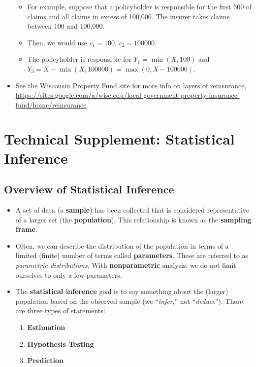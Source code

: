 \documentclass[]{book}
\theoremstyle{definition}
\theoremstyle{definition}
\theoremstyle{definition}
\theoremstyle{remark}
\begin{document}
\begin{itemize}
  \begin{itemize}
  \item
    For example, suppose that a policyholder is responsible for the
    first 500 of claims and all claims in excess of 100,000. The insurer
    takes claims between 100 and 100,000.
  \item
    Then, we would use \(c_1 = 100\), \(c_2 =100000\).
  \item
    The policyholder is responsible for \(Y_1 =\min(X,100)\) and
    \(Y_3 = X - \min(X,100000) = \max(0, X-100000)\).
  \end{itemize}
\item
  See the Wisconsin Property Fund site for more info on layers of
  reinsurance,
  \url{https://sites.google.com/a/wisc.edu/local-government-property-insurance-fund/home/reinsurance}
\end{itemize}

\chapter{Technical Supplement: Statistical
Inference}\label{technical-supplement-statistical-inference}

\section{Overview of Statistical
Inference}\label{overview-of-statistical-inference}

\begin{itemize}
\item
  A set of data (a \textbf{sample}) has been collected that is
  considered representative of a larger set (the \textbf{population}).
  This relationship is known as the \textbf{sampling frame}.
\item
  Often, we can describe the distribution of the population in terms of
  a limited (finite) number of terms called \textbf{parameters}. These
  are referred to as \emph{parametric distributions}. With
  \textbf{nonparametric} analysis, we do not limit ourselves to only a
  few parameters.
\item
  The \textbf{statistical inference} goal is to say something about the
  (larger) population based on the observed sample (we ``\emph{infer},''
  not ``\emph{deduce}''). There are three types of statements:

  \begin{enumerate}
  \def\labelenumi{\arabic{enumi}.}
  \item
    \textbf{Estimation}
  \item
    \textbf{Hypothesis Testing}
  \item
    \textbf{Prediction}
  \end{enumerate}
\end{itemize}
\end{document}
